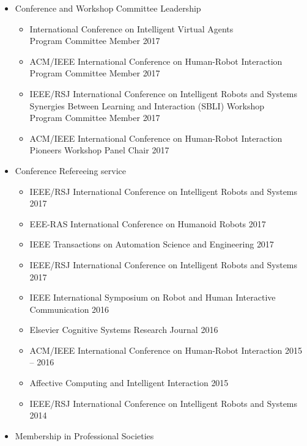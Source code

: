 \documentclass[10pt,letterpaper]{article}
\newcommand{\thing}[2]{{#1} \hfill {#2}}
\begin{document}
\begin{itemize}%
\item Conference and Workshop Committee Leadership
	\begin{itemize}\setlength\itemsep{0em}
	\item \thing{International Conference on Intelligent Virtual Agents\\Program Committee Member}{2017}
	\item \thing{ACM/IEEE International Conference on Human-Robot Interaction\\Program Committee Member}{2017}
	\item \thing{IEEE/RSJ International Conference on Intelligent Robots and Systems\\Synergies Between Learning and Interaction (SBLI) Workshop\\Program Committee Member}{2017}
	\item \thing{ACM/IEEE International Conference on Human-Robot Interaction\\Pioneers Workshop Panel Chair}{2017}
	\end{itemize}
\item Conference Refereeing service
	\begin{itemize}\setlength\itemsep{0em}
	\item \thing{IEEE/RSJ International Conference on Intelligent Robots and Systems}{2017}
	\item \thing{EEE-RAS International Conference on Humanoid Robots}{2017}
	\item \thing{IEEE Transactions on Automation Science and Engineering}{2017}
	\item \thing{IEEE/RSJ International Conference on Intelligent Robots and Systems}{2017}
	\item \thing{IEEE International Symposium on Robot and Human Interactive Communication}{2016}
	\item \thing{Elsevier Cognitive Systems Research Journal}{2016}
	\item \thing{ACM/IEEE International Conference on Human-Robot Interaction}{2015 -- 2016}
	\item \thing{Affective Computing and Intelligent Interaction}{2015}
	\item \thing{IEEE/RSJ International Conference on Intelligent Robots and Systems}{2014}
	\end{itemize}
\item Membership in Professional Societies
	\begin{itemize}\setlength\itemsep{0em}

\end{itemize}
\end{itemize}
\end{document}
